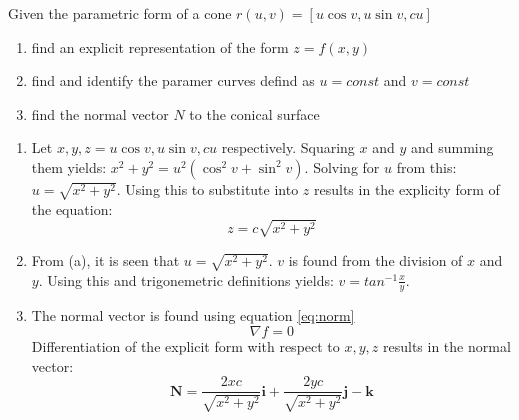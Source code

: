 Given the parametric form of a cone $r\left(u,v\right)= [ u\cos v, u\sin v, cu]$
\begin{enumerate}
	\item find an explicit representation of the form $z=f\left(x,y\right)$
	\item find and identify the paramer curves defind as $u=const$ and $v=const$
	\item find the normal vector $N$ to the conical surface
\end{enumerate}

\begin{enumerate}
	\item Let $x,y,z= u\cos v , u\sin v, cu$ respectively. Squaring $x$ and $y$ and summing them yields: $x^2+y^2= u^2\left( \cos^2v+\sin^2v\right)$. Solving for $u$ from this: $u=\sqrt{x^2+y^2}$. Using this to substitute into $z$ results in the explicity form of the equation:
	\begin{equation}
	\boxed{
		z=c\sqrt{x^2+y^2}
		}
	\end{equation}
	
	\item From (a), it is seen that $\boxed{u=\sqrt{x^2+y^2}}$. $v$ is found from the division of $x$ and $y$. Using this and trigonemetric definitions yields: $\boxed{v=tan^{-1} \frac{x}{y}}$. 
	
	\item The normal vector is found using equation \ref{eq:norm}
		\begin{equation}
			\nabla f=0
			\label{eq:norm}
		\end{equation}
		Differentiation of the explicit form with respect to $x,y,z$ results in the normal vector:
		\begin{equation*}
			\boxed{
				\boldsymbol{N}=\frac{2xc}{\sqrt{x^2+y^2}}\boldsymbol{i}+\frac{2yc}{\sqrt{x^2+y^2}}\boldsymbol{j}-\boldsymbol{k}
				}
		\end{equation*}
\end{enumerate}